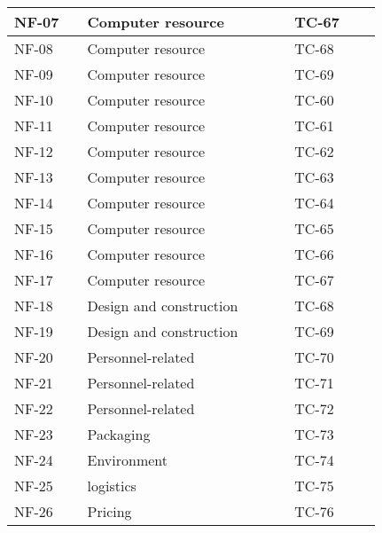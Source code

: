 \begin{sidewaystable}
\begin{longtable}{| p{1.1cm}  | p{2cm}  | p{5cm} |  p{1.5cm}  | p{1.5cm}  |  p{1.5cm}  | p{1.5cm}  |  p{1.5cm}  | p{2cm}  |  }
		NF-07&& Computer resource&&&& TC-67 && \\ \hline
		NF-08&& Computer resource&&&& TC-68 && \\ \hline
		NF-09&& Computer resource&&&& TC-69 && \\ \hline
		NF-10&& Computer resource&&&& TC-60 && \\ \hline
		NF-11&& Computer resource&&&& TC-61 && \\ \hline
		NF-12&& Computer resource&&&& TC-62 && \\ \hline
		NF-13&& Computer resource&&&& TC-63 && \\ \hline
		NF-14&& Computer resource&&&& TC-64 && \\ \hline
		NF-15&& Computer resource&&&& TC-65 && \\ \hline
		NF-16&& Computer resource&&&& TC-66 && \\ \hline
		NF-17&& Computer resource&&&& TC-67 && \\ \hline
		NF-18&& Design and construction&&&& TC-68 && \\ \hline
		NF-19&& Design and construction&&&& TC-69 && \\ \hline
		NF-20&& Personnel-related&&&& TC-70 && \\ \hline
		NF-21&& Personnel-related&&&& TC-71 && \\ \hline
		NF-22&& Personnel-related&&&& TC-72 && \\ \hline
		NF-23&& Packaging&&&& TC-73 && \\ \hline
		NF-24&& Environment&&&& TC-74 && \\ \hline
		NF-25&& logistics&& &&  TC-75 & \\ \hline
		NF-26&& Pricing && &&  TC-76 & \\ \hline
	\end{longtable}
\end{sidewaystable}